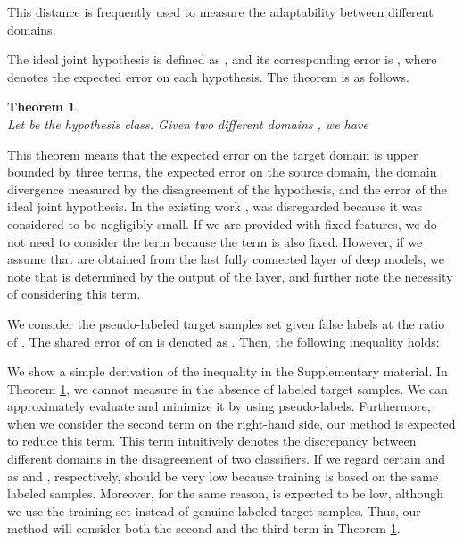 \documentclass{article}
\newtheorem{theorem}{Theorem}
\begin{document}
This distance is frequently used to measure the adaptability between different domains.

The ideal joint hypothesis is defined as , and its corresponding error is , where  denotes the expected error on each hypothesis.
The theorem is as follows.
\begin{theorem}\upshape \cite{ben2010theory}\\
Let  be the hypothesis class. Given two different domains , we have


\label{th:thm1}
\end{theorem}
This theorem means that the expected error on the target domain is upper bounded by three terms, the expected error on the source domain, the domain divergence measured by the disagreement of the hypothesis, and the error of the ideal joint hypothesis.
In the existing work \cite{ganin2014unsupervised,long2015learning},  was disregarded because it was considered to be negligibly small. If we are provided with fixed features, we do not need to consider the term because the term is also fixed.
However, if we assume that  are obtained from the last fully connected layer of deep models, we note that  is determined by the output of the layer, and further note the necessity of considering this term.

We consider the pseudo-labeled target samples set  given false labels at the ratio of . The shared error of  on  is denoted as . Then, the following inequality holds: 



We show a simple derivation of the inequality in the Supplementary material.
In Theorem \ref{th:thm1}, we cannot measure  in the absence of labeled target samples. We can approximately evaluate and minimize it by using pseudo-labels. Furthermore, when we consider the second term on the right-hand side, our method is expected to reduce this term. This term intuitively denotes the discrepancy between different domains in the disagreement of two classifiers. If we regard certain  and  as  and , respectively,  should be very low because training is based on the same labeled samples. Moreover, for the same reason,  is expected to be low, although we use the training set  instead of genuine labeled target samples. Thus, our method will consider both the second and the third term in Theorem \ref{th:thm1}.
\end{document}
